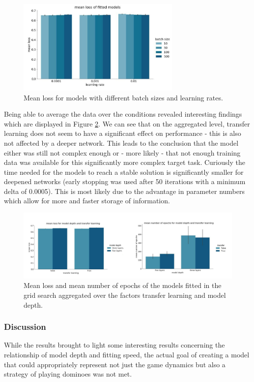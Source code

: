 \documentclass[12pt,a4paper]{article}
\begin{document}
{\begin{figure}
  \includegraphics[width=8cm]{img/means_aggr.jpg}
  \centering 
  \caption{Mean loss for models with different batch sizes and learning rates.}
  \label{fig:means_aggr}
\end{figure}

Being able to average the data over the conditions revealed interesting findings which are displayed in Figure \ref{fig:grdsrch}. We can see that on the aggregated level, transfer learning does not seem to have a significant effect on performance - this is also not affected by a deeper network. This leads to the conclusion that the model either was still not complex enough or - more likely - that not enough training data was available for this significantly more complex target task. Curiously the time needed for the models to reach a stable solution is significantly smaller for deepened networks (early stopping was used after 50 iterations with a minimum delta of 0.0005). This is most likely due to the advantage in parameter numbers which allow for more and faster storage of information.

\begin{figure}
  \includegraphics[width=\linewidth]{img/gridsrch_comb.jpg}
  \centering 
  \caption{Mean loss and mean number of epochs of the models fitted in the grid search aggregated over the factors transfer learning and model depth.}
  \label{fig:grdsrch}
\end{figure}

\subsubsection{Discussion}
While the results brought to light some interesting results concerning the relationship of model depth and fitting speed, the actual goal of creating a model that could appropriately represent not just the game dynamics but also a strategy of playing dominoes was not met. 

}
\end{document}

